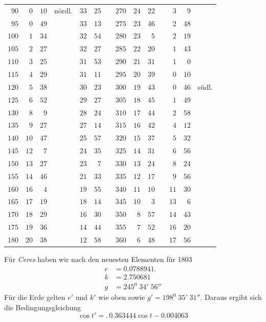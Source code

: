 \begin{center}
\begin{tabular}{r|rrl|rrl||r|rrl|rrl}
$90$&$0$&$10$&nördl.&$33$&$25$&&$270$&$24$&$22$&&$3$&$9$&\\[3pt]
$95$&$0$&$49$&&$33$&$13$&&$275$&$23$&$46$&&$2$&$48$&\\
$100$&$1$&$34$&&$32$&$54$&&$280$&$23$&$5$&&$2$&$19$&\\
$105$&$2$&$27$&&$32$&$27$&&$285$&$22$&$20$&&$1$&$43$&\\
$110$&$3$&$25$&&$31$&$53$&&$290$&$21$&$31$&&$1$&$0$&\\
$115$&$4$&$29$&&$31$&$11$&&$295$&$20$&$39$&&$0$&$10$&\\
$120$&$5$&$38$&&$30$&$23$&&$300$&$19$&$43$&&$0$&$46$&südl.\\[3pt]
$125$&$6$&$52$&&$29$&$27$&&$305$&$18$&$45$&&$1$&$49$&\\
$130$&$8$&$9$&&$28$&$24$&&$310$&$17$&$44$&&$2$&$58$&\\
$135$&$9$&$27$&&$27$&$14$&&$315$&$16$&$42$&&$4$&$12$&\\
$140$&$10$&$47$&&$25$&$57$&&$320$&$15$&$37$&&$5$&$32$&\\
$145$&$12$&$7$&&$24$&$35$&&$325$&$14$&$31$&&$6$&$56$&\\
$150$&$13$&$27$&&$23$&$7$&&$330$&$13$&$24$&&$8$&$24$&\\[3pt]
$155$&$14$&$46$&&$21$&$33$&&$335$&$12$&$17$&&$9$&$56$&\\
$160$&$16$&$4$&&$19$&$55$&&$340$&$11$&$10$&&$11$&$30$&\\
$165$&$17$&$19$&&$18$&$14$&&$345$&$10$&$3$&&$13$&$6$&\\
$170$&$18$&$29$&&$16$&$30$&&$350$&$8$&$57$&&$14$&$43$&\\
$175$&$19$&$36$&&$14$&$44$&&$355$&$7$&$52$&&$16$&$20$&\\
$180$&$20$&$38$&&$12$&$58$&&$360$&$6$&$48$&&$17$&$56$&
\end{tabular}
\endgroup
\end{center}

Für \textit{Ceres} haben wir nach den neuesten Elementen für 1803
\[
\begin{aligned}
e&=0.0788941.\\
k&=2.750681\\
g&=245^0\;34'\;56''
\end{aligned}
\]
Für die Erde gelten $e'$ und $k'$ wie oben sowie $g'=198^0\;35'\;31''$.
Daraus ergibt sich die Bedingungsgleichung
\[
\cos t'=.\,0.363444\cos t-0.004063
\]

